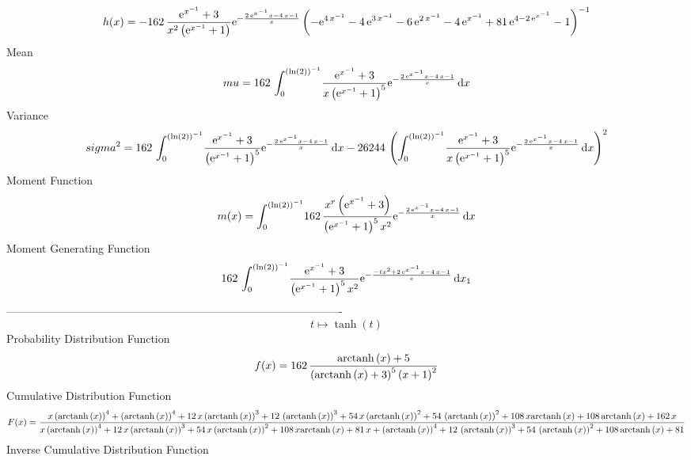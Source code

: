 \documentclass[12pt]{article}
\begin{document}
 $$ h(x)=-162\,{\frac {{{\rm e}^{{x}^{-1}}}+3}{{x}^{2} \left( {{\rm e}^{{x}^{-1
}}}+1 \right) }{{\rm e}^{-{\frac {2\,{{\rm e}^{{x}^{-1}}}x-4\,x-1}{x}}
}} \left( -{{\rm e}^{4\,{x}^{-1}}}-4\,{{\rm e}^{3\,{x}^{-1}}}-6\,{
{\rm e}^{2\,{x}^{-1}}}-4\,{{\rm e}^{{x}^{-1}}}+81\,{{\rm e}^{4-2\,{
{\rm e}^{{x}^{-1}}}}}-1 \right) ^{-1}}
$$Mean 
 $$ mu=162\,\int_{0}^{ \left( \ln  \left( 2 \right)  \right) ^{-1}}\!{\frac {
{{\rm e}^{{x}^{-1}}}+3}{x \left( {{\rm e}^{{x}^{-1}}}+1 \right) ^{5}}{
{\rm e}^{-{\frac {2\,{{\rm e}^{{x}^{-1}}}x-4\,x-1}{x}}}}}\,{\rm d}x
$$ Variance 
 $$ sigma^2 = 162\,\int_{0}^{ \left( \ln  \left( 2 \right)  \right) ^{-1}}\!{\frac {
{{\rm e}^{{x}^{-1}}}+3}{ \left( {{\rm e}^{{x}^{-1}}}+1 \right) ^{5}}{
{\rm e}^{-{\frac {2\,{{\rm e}^{{x}^{-1}}}x-4\,x-1}{x}}}}}\,{\rm d}x-
26244\, \left( \int_{0}^{ \left( \ln  \left( 2 \right)  \right) ^{-1}}
\!{\frac {{{\rm e}^{{x}^{-1}}}+3}{x \left( {{\rm e}^{{x}^{-1}}}+1
 \right) ^{5}}{{\rm e}^{-{\frac {2\,{{\rm e}^{{x}^{-1}}}x-4\,x-1}{x}}}
}}\,{\rm d}x \right) ^{2}
$$Moment Function 
 $$ m(x) = \int_{0}^{ \left( \ln  \left( 2 \right)  \right) ^{-1}}\!162\,{\frac {
{x}^{r} \left( {{\rm e}^{{x}^{-1}}}+3 \right) }{ \left( {{\rm e}^{{x}^
{-1}}}+1 \right) ^{5}{x}^{2}}{{\rm e}^{-{\frac {2\,{{\rm e}^{{x}^{-1}}
}x-4\,x-1}{x}}}}}\,{\rm d}x
$$ Moment Generating Function 
 $$162\,\int_{0}^{ \left( \ln  \left( 2 \right)  \right) ^{-1}}\!{\frac {
{{\rm e}^{{x}^{-1}}}+3}{ \left( {{\rm e}^{{x}^{-1}}}+1 \right) ^{5}{x}
^{2}}{{\rm e}^{-{\frac {-t{x}^{2}+2\,{{\rm e}^{{x}^{-1}}}x-4\,x-1}{x}}
}}}\,{\rm d}x_{{1}}
$$-------------------------------------------------------------------------------------------  \\$$t\mapsto \tanh \left( t \right) 
$$Probability Distribution Function 
$$  f(x)=162\,{\frac {{\rm arctanh} \left(x\right)+5}{ \left( {\rm arctanh} 
\left(x\right)+3 \right) ^{5} \left( x+1 \right) ^{2}}}
$$Cumulative Distribution Function  
 $$F(x)={\frac {x \left( {\rm arctanh} \left(x\right) \right) ^{4}+ \left( 
{\rm arctanh} \left(x\right) \right) ^{4}+12\,x \left( {\rm arctanh} 
\left(x\right) \right) ^{3}+12\, \left( {\rm arctanh} \left(x\right)
 \right) ^{3}+54\,x \left( {\rm arctanh} \left(x\right) \right) ^{2}+
54\, \left( {\rm arctanh} \left(x\right) \right) ^{2}+108\,x
{\rm arctanh} \left(x\right)+108\,{\rm arctanh} \left(x\right)+162\,x
}{x \left( {\rm arctanh} \left(x\right) \right) ^{4}+12\,x \left( 
{\rm arctanh} \left(x\right) \right) ^{3}+54\,x \left( {\rm arctanh} 
\left(x\right) \right) ^{2}+108\,x{\rm arctanh} \left(x\right)+81\,x+
 \left( {\rm arctanh} \left(x\right) \right) ^{4}+12\, \left( 
{\rm arctanh} \left(x\right) \right) ^{3}+54\, \left( {\rm arctanh} 
\left(x\right) \right) ^{2}+108\,{\rm arctanh} \left(x\right)+81}}
$$ Inverse Cumulative Distribution Function 
\end{document}
